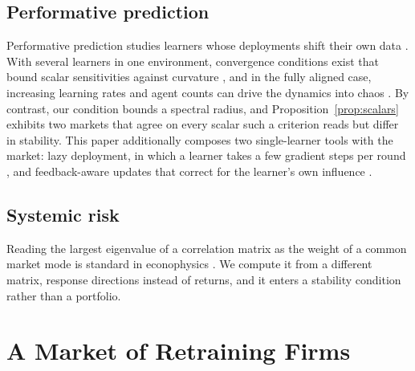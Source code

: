 \documentclass[conference]{IEEEtran}
\theoremstyle{definition}
\begin{document}
\subsection{Performative prediction}
Performative prediction studies learners whose deployments shift their own
data \cite{perdomo2020}. With several learners in one environment, convergence
conditions exist that bound scalar sensitivities against curvature
\cite{narang2023}, and in the fully aligned case, increasing learning rates
and agent counts can drive the dynamics into chaos \cite{piliouras2023}. By
contrast, our condition bounds a spectral radius, and
Proposition~\ref{prop:scalars} exhibits two markets that agree on every scalar
such a criterion reads but differ in stability. This paper additionally
composes two single-learner tools with the market: lazy deployment, in which a
learner takes a few gradient steps per round \cite{mendler2020}, and
feedback-aware updates that correct for the learner's own influence
\cite{izzo2021,miller2021}.

\subsection{Systemic risk}
Reading the largest eigenvalue of a correlation matrix as the weight of a
common market mode is standard in econophysics \cite{laloux1999,plerou2002}.
We compute it from a different matrix, response directions instead of returns,
and it enters a stability condition rather than a portfolio.

\section{A Market of Retraining Firms}
\end{document}
